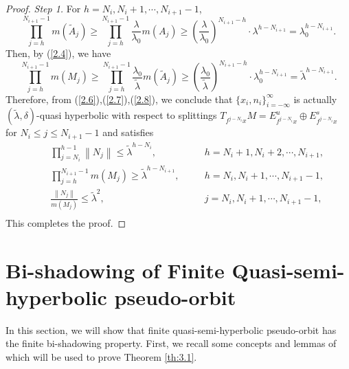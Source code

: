 \documentclass[12pt]{article}
\begin{document}
\begin{proof}{\em Step 1.}
	For $h=N_{i},N_{i}+1,\cdots,N_{i+1}-1$,
	$$
	\prod_{j=h}^{N_{i+1}-1} m(\widetilde{A}_{j})\geqslant \prod_{j=h}^{N_{i+1}-1} \frac{\lambda}{\lambda_{0}}m(A_{j})\geqslant(\frac{\lambda}{\lambda_{0}})^{N_{i+1}-h}\cdot\lambda^{h-N_{i+1}}=\lambda_{0}^{h-N_{i+1}}.
	$$ 
	Then, by (\ref{2.4}), we have 
	\begin{equation}\label{2.8}
		\prod_{j=h}^{N_{i+1}-1} m(M_{j})\geqslant \prod_{j=h}^{N_{i+1}-1} \frac{\lambda_{0}}{\widetilde{\lambda}}m(\widetilde{A}_{j}) \geqslant (\frac{\lambda_{0}}{\widetilde{\lambda}})^{N_{i+1}-h}\cdot\lambda_{0}^{h-N_{i+1}}=\widetilde{\lambda}^{h-N_{i+1}}.
	\end{equation}
	Therefore, from (\ref{2.6}),(\ref{2.7}),(\ref{2.8}), we conclude that $ \{x_{i},n_{i}\}_{i=-\infty}^{\infty} $ is actually  $(\widetilde{\lambda},\delta)$-quasi hyperbolic with respect to splittings $T_{f^{j-N_{i}}x}M=E^u_{f^{j-N_{i}}x}\oplus E^s_{f^{j-N_{i}}x} $ for $ N_{i}\leqslant j\leqslant N_{i+1}-1 $ and satisfies
	\begin{equation*}
		\begin{alignedat}{2}
			&\quad \prod_{j=N_{i}}^{h-1} \left\|N_{j}\right\|\leqslant \widetilde{\lambda}^{h-N_{i}}, && \quad h=N_{i}+1,N_{i}+2,\cdots,N_{i+1},  \\
			&\quad \prod_{j=h}^{N_{i+1}-1} m(M_{j})\geqslant \widetilde{\lambda}^{h-N_{i+1}}, &&\quad h=N_{i},N_{i}+1,\cdots,N_{i+1}-1, \\
			&\quad \frac{\left\|N_{j}\right\|}{m(M_{j})}\leqslant\widetilde{\lambda}^{2}, &&\quad j=N_{i},N_{i}+1,\cdots,N_{i+1}-1,\\ 
		\end{alignedat}
	\end{equation*}
	This completes the proof.
\end{proof}


\section{Bi-shadowing of Finite Quasi-semi-hyperbolic pseudo-orbit}\label{Section 3}
\hfuzz=15pt %
\overfullrule=0pt %
In this section, we will show that finite quasi-semi-hyperbolic pseudo-orbit has the finite bi-shadowing property. First, we recall some concepts and lemmas of \cite{SG} which will be used to prove Theorem \ref{th:3.1}.
\end{document}

